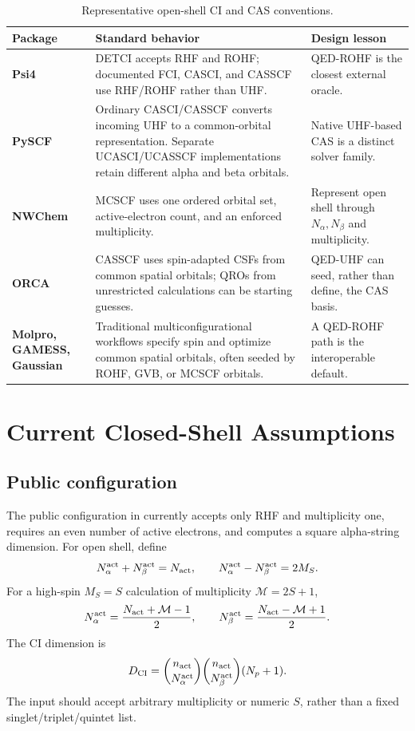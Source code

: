 \documentclass[11pt]{article}
\begin{document}
\begin{table}[htbp]
\centering
\caption{Representative open-shell CI and CAS conventions.}
\label{tab:packages}
\begin{tabularx}{\textwidth}{>{\bfseries}p{} X X}
\toprule
Package & Standard behavior & Design lesson \\
\midrule
Psi4 & DETCI accepts RHF and ROHF; documented FCI, CASCI, and CASSCF use
RHF/ROHF rather than UHF. & QED-ROHF is the closest external oracle. \\
PySCF & Ordinary CASCI/CASSCF converts incoming UHF to a common-orbital
representation. Separate UCASCI/UCASSCF implementations retain different
alpha and beta orbitals. & Native UHF-based CAS is a distinct solver family. \\
NWChem & MCSCF uses one ordered orbital set, active-electron count, and an
enforced multiplicity. & Represent open shell through \(N_\alpha,N_\beta\)
and multiplicity. \\
ORCA & CASSCF uses spin-adapted CSFs from common spatial orbitals; QROs from
unrestricted calculations can be starting guesses. & QED-UHF can seed, rather
than define, the CAS basis. \\
Molpro, GAMESS, Gaussian & Traditional multiconfigurational workflows specify
spin and optimize common spatial orbitals, often seeded by ROHF, GVB, or MCSCF
orbitals. & A QED-ROHF path is the interoperable default. \\
\bottomrule
\end{tabularx}
\end{table}

\section{Current Closed-Shell Assumptions}

\subsection{Public configuration}

The public configuration in  currently accepts only
RHF and multiplicity one, requires an even number of active electrons, and
computes a square alpha-string dimension. For open shell, define
\[
N_\alpha^{\rm act}+N_\beta^{\rm act}=N_{\rm act},\qquad
N_\alpha^{\rm act}-N_\beta^{\rm act}=2M_S.
\]
For a high-spin \(M_S=S\) calculation of multiplicity \(\mathcal M=2S+1\),
\[
N_\alpha^{\rm act}=\frac{N_{\rm act}+\mathcal M-1}{2},\qquad
N_\beta^{\rm act}=\frac{N_{\rm act}-\mathcal M+1}{2}.
\]
The CI dimension is
\[
D_{\rm CI}=\binom{n_{\rm act}}{N_\alpha^{\rm act}}
\binom{n_{\rm act}}{N_\beta^{\rm act}}(N_p+1).
\]
The input should accept arbitrary multiplicity or numeric \(S\), rather than a
fixed singlet/triplet/quintet list.
\end{document}
